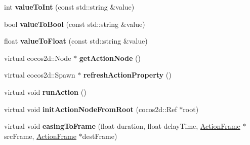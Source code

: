 \begin{DoxyCompactItemize}
\mbox{\label{classcocostudio_1_1ActionNode_ac8200229cdb1c5ce27db2bbc778f4c50}} 
int {\bfseries value\+To\+Int} (const std\+::string \&value)
\item 
\mbox{\label{classcocostudio_1_1ActionNode_a3929a6071bd32fe30ef2c2b2d07c65b0}} 
bool {\bfseries value\+To\+Bool} (const std\+::string \&value)
\item 
\mbox{\label{classcocostudio_1_1ActionNode_a5d305b5a9faa5923f570cbd687f98ffb}} 
float {\bfseries value\+To\+Float} (const std\+::string \&value)
\item 
\mbox{\label{classcocostudio_1_1ActionNode_ac7914e947a992b897d251b5c8fb40777}} 
virtual cocos2d\+::\+Node $\ast$ {\bfseries get\+Action\+Node} ()
\item 
\mbox{\label{classcocostudio_1_1ActionNode_ad107ca85c309a39799a5358160599ad1}} 
virtual cocos2d\+::\+Spawn $\ast$ {\bfseries refresh\+Action\+Property} ()
\item 
\mbox{\label{classcocostudio_1_1ActionNode_a39d2687fa3e50bfa5c7c433b3c3a7406}} 
virtual void {\bfseries run\+Action} ()
\item 
\mbox{\label{classcocostudio_1_1ActionNode_aa9d17e0087c2c8584b70230ecab9d6cc}} 
virtual void {\bfseries init\+Action\+Node\+From\+Root} (cocos2d\+::\+Ref $\ast$root)
\item 
\mbox{\label{classcocostudio_1_1ActionNode_ad94852bec6432df343d5441aad1b6f59}} 
virtual void {\bfseries easing\+To\+Frame} (float duration, float delay\+Time, \hyperlink{classcocostudio_1_1ActionFrame}{Action\+Frame} $\ast$src\+Frame, \hyperlink{classcocostudio_1_1ActionFrame}{Action\+Frame} $\ast$dest\+Frame)
\end{DoxyCompactItemize}
